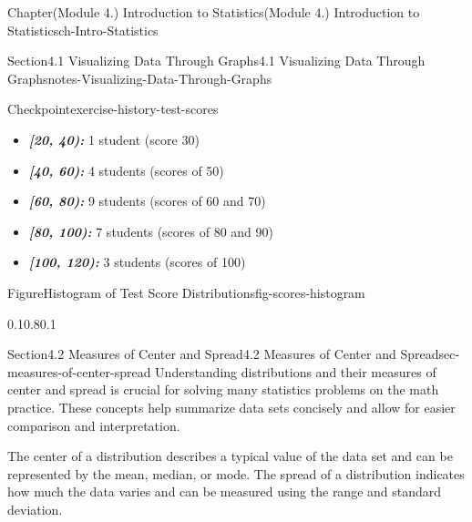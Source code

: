 \documentclass[oneside,10pt,]{book}
\newcommand{\ptxlistdisc}{\raisebox{0.3ex}{\textbullet}}
\newcommand{\alert}[1]{\textbf{\textit{#1}}}
\begin{document}
\begin{chapterptx}{Chapter}{(Module 4.) Introduction to Statistics}{}{(Module 4.) Introduction to Statistics}{}{}{ch-Intro-Statistics}
\begin{sectionptx}{Section}{4.1 Visualizing Data Through Graphs}{}{4.1 Visualizing Data Through Graphs}{}{}{notes-Visualizing-Data-Through-Graphs}
\begin{inlineexercise}{Checkpoint}{}{exercise-history-test-scores}
\par
%
\begin{itemize}[label=\ptxlistdisc]
\item{}\alert{[20, 40):} 1 student (score 30)%
\item{}\alert{[40, 60):} 4 students (scores of 50)%
\item{}\alert{[60, 80):} 9 students (scores of 60 and 70)%
\item{}\alert{[80, 100):} 7 students (scores of 80 and 90)%
\item{}\alert{[100, 120):} 3 students (scores of 100)%
\end{itemize}
%
\begin{figureptx}{Figure}{Histogram of Test Score Distributions}{fig-scores-histogram}{}%
\begin{image}{0.1}{0.8}{0.1}{}%
%
\end{image}%
\tcblower
\end{figureptx}%
\end{inlineexercise}%
\end{sectionptx}
%
%
\typeout{************************************************}
\typeout{************************************************}
%
\begin{sectionptx}{Section}{4.2 Measures of Center and Spread}{}{4.2 Measures of Center and Spread}{}{}{sec-measures-of-center-spread}
Understanding distributions and their measures of center and spread is crucial for solving many statistics problems on the math practice. These concepts help summarize data sets concisely and allow for easier comparison and interpretation.%
\par
The center of a distribution describes a typical value of the data set and can be represented by the mean, median, or mode. The spread of a distribution indicates how much the data varies and can be measured using the range and standard deviation.%

\end{sectionptx}
\end{chapterptx}
\end{document}
